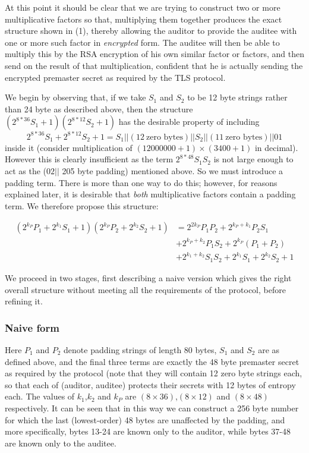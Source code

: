\documentclass[10pt,a4paper]{article}
\begin{document}
\noindent At this point it should be clear that we are trying to construct two or more multiplicative factors so that, multiplying them together produces the exact structure shown in (1), thereby allowing the auditor to provide the auditee with one or more such factor in \textit{encrypted} form. The auditee will then be able to multiply this by the RSA encryption of his own similar factor or factors, and then send on the result of that multiplication, confident that he is actually sending the encrypted premaster secret as required by the TLS protocol.

\pagebreak

\noindent We begin by observing that, if we take $S_1$ and $S_2$ to be 12 byte strings rather than 24 byte as described above, then  the structure $(2^{8*36}S_1+1)(2^{8*12}S_2+1)$ has the desirable property of including 
\begin{equation*}
2^{8*36}S_1+2^{8*12}S_2+1=S_1||(12\ \textrm{zero bytes}) || S_2 ||( 11\ \textrm{zero bytes}) || 01
\end{equation*}
\noindent inside it (consider multiplication of $(12000000+1) \times (3400+1)$ in decimal). However this is clearly insufficient as the term $2^{8*48}S_1S_2$ is not large enough to act as the ($02||$ 205 byte padding) mentioned above. So we must introduce a padding term. There is  more than one way to do this; however, for reasons explained later, it is desirable that \emph{both} multiplicative factors contain a padding term. We therefore propose this structure:

\begin{equation}\label{expanded}
\begin{split}
(2^{k_P}P_1+2^{k_1}S_1+1)(2^{k_P}P_2+2^{k_2}S_2+1) &= 2^{2k_P} P_1 P_2 + 2^{k_P+k_1}P_2S_1 \\
					&+2^{k_P+k_2}P_1S_2 + 2^{k_P}(P_1+P_2) \\
					&+ 2^{k_1+k_2}S_1S_2 +2^{k_1}S_1+2^{k_2}S_2+1
\end{split}
\end{equation}

\noindent We proceed in two stages, first describing a naive version which gives the right overall structure without meeting all the requirements of the protocol, before refining it.

\subsubsection{Naive form}
\noindent Here $P_1$ and $P_2$ denote padding strings of length 80 bytes, $S_1$ and $S_2$ are as defined above, and the final three terms are exactly the 48 byte premaster secret as required by the protocol (note that they will contain 12 zero byte strings each, so that each of (auditor, auditee) protects their secrets with 12 bytes of entropy each. The values of $k_1$,$k_2$ and $k_P$ are $(8 \times 36)$,$(8 \times 12)$ and $(8 \times 48)$ respectively. It can be seen that in this way we can construct a 256 byte number for which the last (lowest-order) 48 bytes are unaffected by the padding, and more specifically, bytes 13-24 are known only to the auditor, while bytes 37-48 are known only to the auditee. 
\end{document}
